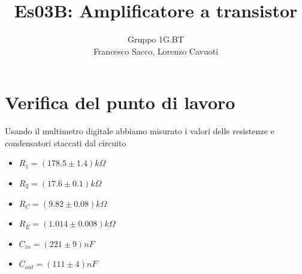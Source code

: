 \documentclass[10pt,a4paper]{article}
\author{Gruppo 1G.BT \\ Francesco Sacco, Lorenzo Cavuoti}
\title{Es03B: Amplificatore a transistor}
\begin{document}
    \maketitle
    \section{Verifica del punto di lavoro}
    Usando il multimetro digitale abbiamo misurato i valori delle resistenze e condensatori staccati dal circuito
\begin{itemize}
\item $R_1=(178.5\pm1.4)k\Omega$ 
\item $R_2=(17.6\pm0.1)k\Omega$ 
\item $R_C=(9.82\pm0.08)k\Omega$ 
\item $R_E=(1.014\pm0.008)k\Omega$
\item $C_{in}=(221\pm9)nF$
\item $C_{out}=(111\pm4)nF$
\end{itemize}
\\
\end{document}
